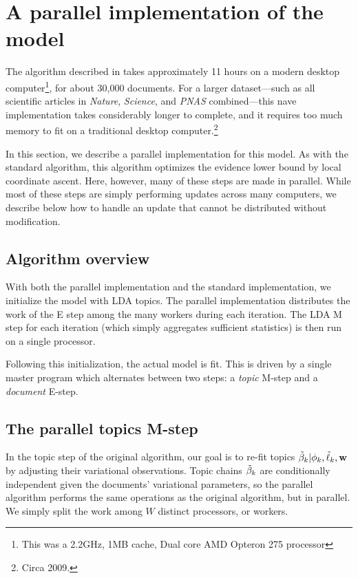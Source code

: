 \section{A parallel implementation of the model}
\label{section:influence_parallel_inference}

The algorithm described in  takes approximately 11
hours on a modern desktop computer\footnote{This was a 2.2GHz, 1MB
  cache, Dual core AMD Opteron 275 processor}, for about 30,000
documents.  For a larger dataset---such as all scientific articles in
\emph{Nature}, \emph{Science}, and \emph{PNAS} combined---this
nave implementation takes considerably longer to complete, and it
requires too much memory to fit on a traditional desktop
computer.\footnote{Circa 2009.}

In this section, we describe a parallel implementation for this model.
As with the standard algorithm, this algorithm optimizes the evidence
lower bound by local coordinate ascent.  Here, however, many of these
steps are made in parallel.  While most of these steps are simply
performing updates across many computers, we describe below how to
handle an update that cannot be distributed without modification.

\subsection*{Algorithm overview}
With both the parallel implementation and the standard implementation,
we initialize the model with LDA topics.  The parallel implementation
distributes the work of the E step among the many workers during each
iteration.  The LDA M step for each iteration (which simply aggregates
sufficient statistics) is then run on a single processor.

Following this initialization, the actual model is fit.  This is
driven by a single master program which alternates between two steps:
a \emph{topic} M-step and a \emph{document} E-step.

\subsection*{The parallel topics M-step}
In the topic step of the original algorithm, our goal is to re-fit
topics $\tilde{\beta}_k | \phi_k, \tilde{\ell}_k, \textbf{w}$ by adjusting their variational
observations.  Topic chains $\tilde{\beta}_k$ are conditionally independent
given the documents' variational parameters, so the parallel algorithm
performs the same operations as the original algorithm, but in
parallel.  We simply split the work among $W$ distinct processors, or
workers.

